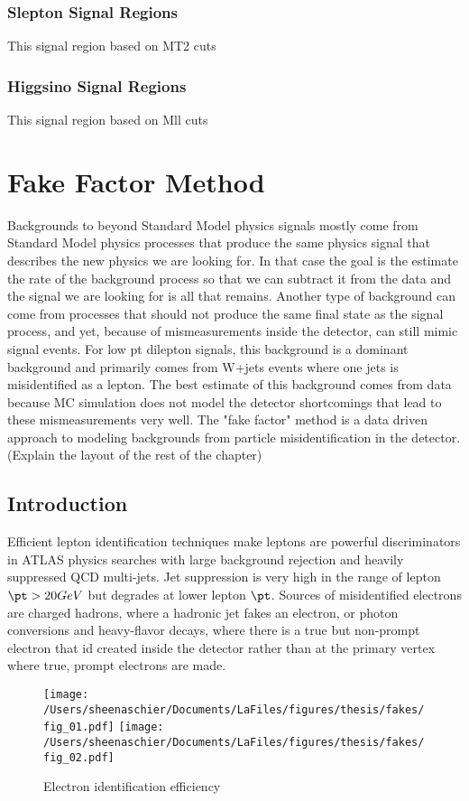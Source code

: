 \documentclass[11pt, oneside]{article}   	%
\begin{document}
\subsubsection{Slepton Signal Regions}
This signal region based on MT2 cuts
\subsubsection{Higgsino Signal Regions}
This signal region based on Mll cuts

\clearpage
\section{Fake Factor Method}
\label{sec:ff}
Backgrounds to beyond Standard Model physics signals mostly come from Standard Model physics processes that produce the same physics signal that describes the new physics we are looking for.  In that case the goal is the estimate the rate of the background process so that we can subtract it from the data and the signal we are looking for is all that remains.  Another type of background can come from processes that should not produce the same final state as the signal process, and yet, because of mismeasurements inside the detector, can still mimic signal events.  For low pt dilepton signals, this background is a dominant background and primarily comes from W+jets events where one jets is misidentified as a lepton.   The best estimate of this background comes from data because MC simulation does not model the detector shortcomings that lead to these mismeasurements very well.  The "fake factor" method is a data driven approach to modeling backgrounds from particle misidentification in the detector.
(Explain the layout of the rest of the chapter)

\subsection{Introduction}
Efficient lepton identification techniques make leptons are powerful discriminators in ATLAS physics searches with large background rejection and heavily suppressed QCD multi-jets.  Jet suppression is very high in the range of lepton $\pt > 20 GeV$ but degrades at lower lepton $\pt$.  Sources of misidentified electrons are charged hadrons, where a hadronic jet fakes an electron, or photon conversions and heavy-flavor decays, where there is a true but non-prompt electron that id created inside the detector rather than at the primary vertex where true, prompt electrons are made.  
\begin{figure}[h!]
 \centering
 \texttt{[image: /Users/sheenaschier/Documents/LaFiles/figures/thesis/fakes/fig\_01.pdf]}
  \texttt{[image: /Users/sheenaschier/Documents/LaFiles/figures/thesis/fakes/fig\_02.pdf]}
 \caption{Electron identification efficiency}
 \label{fig:electronID}
 \end{figure}
\end{document}
